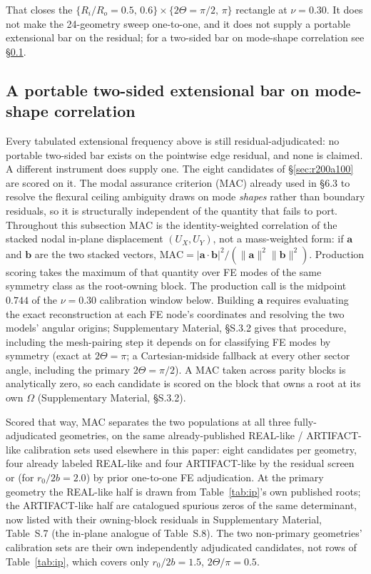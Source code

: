 \documentclass[11pt]{article}
\begin{document}
That closes the $\{R_i/R_o=0.5,\,0.6\}\times\{2\Theta=\pi/2,\,\pi\}$
rectangle at $\nu=0.30$. It does not make the 24-geometry sweep
one-to-one, and it does not supply a portable extensional bar on the
residual; for a two-sided bar on mode-shape correlation see
\S\ref{sec:ipmacbar}.

\subsection{A portable two-sided extensional bar on mode-shape
correlation}\label{sec:ipmacbar}
Every tabulated extensional frequency above is still residual-adjudicated:
no portable two-sided bar exists on the pointwise edge residual, and none
is claimed. A different instrument does supply one. The eight candidates
of \S\ref{sec:r200a100} are scored on it. The modal assurance criterion (MAC) already used
in \S6.3 to resolve the flexural ceiling ambiguity draws on mode \emph{shapes} rather than boundary residuals, so it is structurally independent of the quantity that fails to port.
Throughout this subsection MAC is the identity-weighted correlation of
the stacked nodal in-plane displacement $(U_X,U_Y)$, not a mass-weighted
form: if $\mathbf{a}$ and $\mathbf{b}$ are the two stacked vectors,
$\mathrm{MAC}=|\mathbf{a}\cdot\mathbf{b}|^2/(\|\mathbf{a}\|^2\|\mathbf{b}\|^2)$.
Production scoring takes the maximum of that quantity over FE modes of
the same symmetry class as the root-owning block. The production call is
the midpoint $0.744$ of the $\nu=0.30$ calibration window below. Building
$\mathbf{a}$ requires evaluating the exact reconstruction at each FE
node's coordinates and resolving the two models' angular origins;
Supplementary Material, §S.3.2 gives that procedure,
including the mesh-pairing step it depends on for classifying FE modes
by symmetry (exact at $2\Theta=\pi$; a Cartesian-midside fallback at
every other sector angle, including the primary $2\Theta=\pi/2$).
A MAC taken across parity blocks is analytically zero, so each
candidate is scored on the block that owns a root at its own $\Omega$
(Supplementary Material, §S.3.2).

Scored that way, MAC separates the two populations at all three
fully-adjudicated geometries, on the same already-published REAL-like /
ARTIFACT-like calibration sets used elsewhere in this paper: eight
candidates per geometry, four already labeled REAL-like and four
ARTIFACT-like by the residual screen or (for $r_0/2b=2.0$) by prior
one-to-one FE adjudication. At the primary geometry the REAL-like half
is drawn from Table~\ref{tab:ip}'s own published roots; the
ARTIFACT-like half are catalogued spurious zeros of the same
determinant, now listed with their owning-block residuals in
Supplementary Material, Table~S.7 (the in-plane analogue of
Table~S.8). The two
non-primary geometries' calibration sets are their own independently
adjudicated candidates, not rows of Table~\ref{tab:ip}, which covers
only $r_0/2b=1.5$, $2\Theta/\pi=0.5$.
\end{document}

